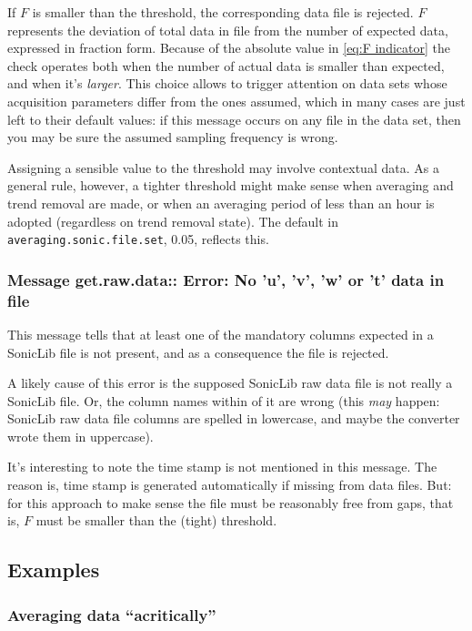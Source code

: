 \documentclass[a4paper,10pt]{book}
\begin{document}
If $F$ is smaller than the threshold, the corresponding data file is rejected. $F$ represents the deviation of total data in file from the number of expected data, expressed in fraction form. Because of the absolute value in \ref{eq:F indicator} the check operates both when the number of actual data is smaller than expected, and when it's \emph{larger}. This choice allows to trigger attention on data sets whose acquisition parameters differ from the ones assumed, which in many cases are just left to their default values: if this message occurs on any file in the data set, then you may be sure the assumed sampling frequency is wrong.

Assigning a sensible value to the threshold may involve contextual data. As a general rule, however, a tighter threshold might make sense when averaging and trend removal are made, or when an averaging period of less than an hour is adopted (regardless on trend removal state). The default in \verb|averaging.sonic.file.set|, 0.05, reflects this.

\subsubsection{Message get.raw.data:: Error: No 'u', 'v', 'w' or 't' data in file}

This message tells that at least one of the mandatory columns expected in a SonicLib file is not present, and as a consequence the file is rejected.

A likely cause of this error is the supposed SonicLib raw data file is not really a SonicLib file. Or, the column names within of it are wrong (this \emph{may} happen: SonicLib raw data file columns are spelled in lowercase, and maybe the converter wrote them in uppercase).

It's interesting to note the time stamp is not mentioned in this message. The reason is, time stamp is generated automatically if missing from data files. But: for this approach to make sense the file must be reasonably free from gaps, that is, $F$ must be smaller than the (tight) threshold.

\subsection{Examples}
\subsubsection{Averaging data ``acritically''}
\end{document}
